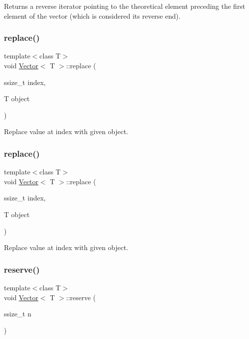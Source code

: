 Returns a reverse iterator pointing to the theoretical element preceding the first element of the vector (which is considered its reverse end). \mbox{\label{classVector_a3c3ccb39cb5e6f3e56b37f913ada4365}} 
\subsubsection{\texorpdfstring{replace()}{replace()}\hspace{0.1cm}{\footnotesize\ttfamily [1/2]}}
{\footnotesize\ttfamily template$<$class T$>$ \\
void \hyperlink{classVector}{Vector}$<$ T $>$\+::replace (\begin{DoxyParamCaption}\item[{ssize\+\_\+t}]{index,  }\item[{T}]{object }\end{DoxyParamCaption})\hspace{0.3cm}{\ttfamily [inline]}}

Replace value at index with given object. \mbox{\label{classVector_a3c3ccb39cb5e6f3e56b37f913ada4365}} 
\subsubsection{\texorpdfstring{replace()}{replace()}\hspace{0.1cm}{\footnotesize\ttfamily [2/2]}}
{\footnotesize\ttfamily template$<$class T$>$ \\
void \hyperlink{classVector}{Vector}$<$ T $>$\+::replace (\begin{DoxyParamCaption}\item[{ssize\+\_\+t}]{index,  }\item[{T}]{object }\end{DoxyParamCaption})\hspace{0.3cm}{\ttfamily [inline]}}

Replace value at index with given object. \mbox{\label{classVector_aebff8698d4672ac51e87d719a15a4a77}} 
\subsubsection{\texorpdfstring{reserve()}{reserve()}\hspace{0.1cm}{\footnotesize\ttfamily [1/2]}}
{\footnotesize\ttfamily template$<$class T$>$ \\
void \hyperlink{classVector}{Vector}$<$ T $>$\+::reserve (\begin{DoxyParamCaption}\item[{ssize\+\_\+t}]{n }\end{DoxyParamCaption})\hspace{0.3cm}{\ttfamily [inline]}}

